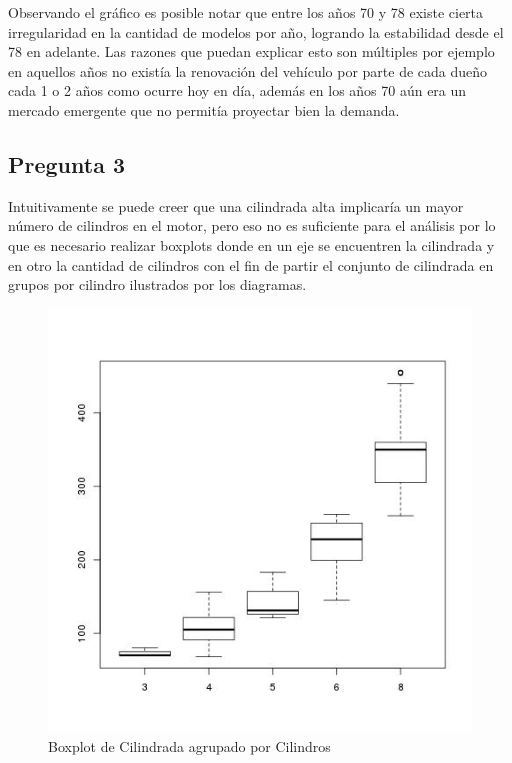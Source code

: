 \documentclass[letter,10pt]{article}
\begin{document}
Observando el gráfico es posible notar que entre los años 70 y 78 existe cierta irregularidad en la cantidad de modelos por
año, logrando la estabilidad desde el 78 en adelante. Las razones que puedan explicar esto son múltiples por ejemplo en aquellos años
no existía la renovación del vehículo por parte de cada dueño cada 1 o 2 años como ocurre hoy en día, además en los años 70 aún
era un mercado emergente que no permitía proyectar bien la demanda.

\newpage

\subsection{Pregunta 3}

Intuitivamente se puede creer que una cilindrada alta implicaría un mayor número de cilindros en el motor,
pero eso no es suficiente para el análisis por lo que es necesario realizar boxplots
donde en un eje se encuentren la cilindrada y en otro la cantidad de cilindros con el fin
de partir el conjunto de cilindrada en grupos por cilindro ilustrados por los diagramas.
\begin{figure}[h!]
    \centering
    \includegraphics[scale=0.4]{boxplot_displacement_cylinders.jpg}
    \caption{Boxplot de Cilindrada agrupado por Cilindros}
    \label{fig:boxplot_displacement_cylinders}
\end{figure}
\end{document}
